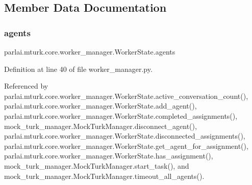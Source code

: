 \subsection{Member Data Documentation}
\mbox{\label{classparlai_1_1mturk_1_1core_1_1worker__manager_1_1WorkerState_a53912abee55c0bd1caaf5575c001d575}} 
\subsubsection{\texorpdfstring{agents}{agents}}
{\footnotesize\ttfamily parlai.\+mturk.\+core.\+worker\+\_\+manager.\+Worker\+State.\+agents}



Definition at line 40 of file worker\+\_\+manager.\+py.



Referenced by parlai.\+mturk.\+core.\+worker\+\_\+manager.\+Worker\+State.\+active\+\_\+conversation\+\_\+count(), parlai.\+mturk.\+core.\+worker\+\_\+manager.\+Worker\+State.\+add\+\_\+agent(), parlai.\+mturk.\+core.\+worker\+\_\+manager.\+Worker\+State.\+completed\+\_\+assignments(), mock\+\_\+turk\+\_\+manager.\+Mock\+Turk\+Manager.\+disconnect\+\_\+agent(), parlai.\+mturk.\+core.\+worker\+\_\+manager.\+Worker\+State.\+disconnected\+\_\+assignments(), parlai.\+mturk.\+core.\+worker\+\_\+manager.\+Worker\+State.\+get\+\_\+agent\+\_\+for\+\_\+assignment(), parlai.\+mturk.\+core.\+worker\+\_\+manager.\+Worker\+State.\+has\+\_\+assignment(), mock\+\_\+turk\+\_\+manager.\+Mock\+Turk\+Manager.\+start\+\_\+task(), and mock\+\_\+turk\+\_\+manager.\+Mock\+Turk\+Manager.\+timeout\+\_\+all\+\_\+agents().

\mbox{\label{classparlai_1_1mturk_1_1core_1_1worker__manager_1_1WorkerState_ab751a2c9f79305a2db1439cd9449006a}} 
